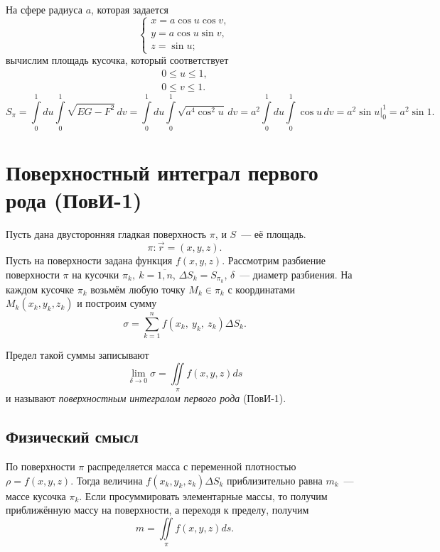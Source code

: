 \documentclass[../../main.tex]{subfiles}
\begin{document}
\begin{exmp}
На сфере радиуса $a$, которая задается
\[
\begin{cases}
 x = a\cos u\cos v, \\
 y = a\cos u\sin v,\\
 z = \sin u;
\end{cases}\]
вычислим площадь кусочка, который соответствует
\begin{gather*}
0 \leq u \leq 1, \\ 0 \leq v \leq 1.
\end{gather*}
\[
 S_\pi = \int\limits_0^1du\int\limits_0^1\sqrt{EG-F^2}\,dv = 
 \int\limits_0^1du\int\limits_0^1\sqrt{a^4\cos^2u}\,dv = 
 a^2\int\limits_0^1du\int\limits_0^1\cos u\,dv = a^2\sin u\big|_0^1 = a^2\sin 1.
\]
\end{exmp}

\section{Поверхностный интеграл первого рода (ПовИ-1)}

Пусть дана двусторонняя гладкая поверхность $\pi$, и $S$~--- её площадь. \[\pi : 
\vec{r} = (x, y, z).\]
Пусть на поверхности задана функция $f(x, y, z)$. 
Рассмотрим разбиение поверхности $\pi$ на кусочки $\pi_k,\ k = \overline{1, n}$, $\Delta 
S_k = S_{\pi_k}$, $\delta$~--- диаметр разбиения. На каждом кусочке $\pi_k$ 
возьмём любую точку $M_k \in \pi_k$ с координатами $M_k(x_k, y_k, z_k)$ и 
построим сумму \[\sigma = \sum\limits_{k = 1}^nf(x_k, \ y_k, \ z_k)\Delta S_k.\]

Предел такой суммы записывают
\[\lim\limits_{\delta\rightarrow0}\sigma = \iint\limits_\pi f(x, y, 
z)ds\] и называют \emph{поверхностным интегралом первого рода} (ПовИ-1).

\subsection{Физический смысл}
По поверхности $\pi$ распределяется масса с переменной плотностью $\rho = f(x, 
y, z)$. Тогда величина $f(x_k, y_k, z_k)\Delta S_k$ 
приблизительно равна $m_k$~--- массе кусочка $\pi_k$. Если просуммировать 
элементарные массы, то получим приближённую массу на поверхности, а переходя к 
пределу, получим \[m = \iint\limits_\pi f(x, y, z)ds.\]
\end{document}
